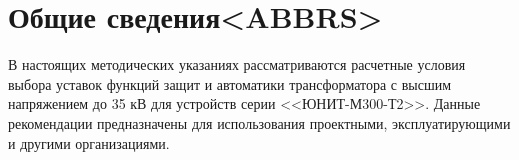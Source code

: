 \color{uniblue}\section[Общие сведения]{\sloppy Общие сведения\color{white!0}<ABBRS>} %
\color{black}

В настоящих методических указаниях рассматриваются расчетные условия выбора уставок функций защит и автоматики трансформатора с высшим напряжением до 35 кВ для устройств серии <<ЮНИТ-М300-Т2>>. Данные рекомендации предназначены для использования проектными, эксплуатирующими и другими организациями.


